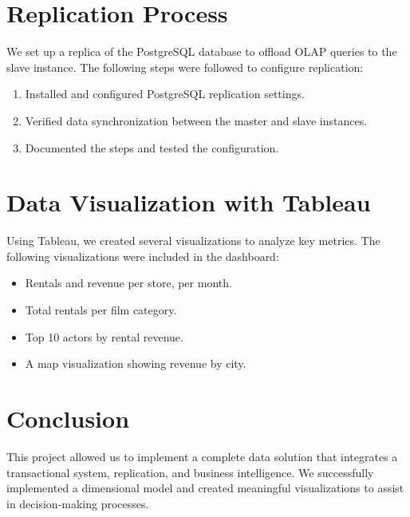 \documentclass[a4paper, 12pt]{article}
\begin{document}
\section{Replication Process}
We set up a replica of the PostgreSQL database to offload OLAP queries to the slave instance. The following steps were followed to configure replication:
\begin{enumerate}
    \item Installed and configured PostgreSQL replication settings.
    \item Verified data synchronization between the master and slave instances.
    \item Documented the steps and tested the configuration.
\end{enumerate}

\section{Data Visualization with Tableau}
Using Tableau, we created several visualizations to analyze key metrics. The following visualizations were included in the dashboard:
\begin{itemize}
    \item Rentals and revenue per store, per month.
    \item Total rentals per film category.
    \item Top 10 actors by rental revenue.
    \item A map visualization showing revenue by city.
\end{itemize}

\section{Conclusion}
This project allowed us to implement a complete data solution that integrates a transactional system, replication, and business intelligence. We successfully implemented a dimensional model and created meaningful visualizations to assist in decision-making processes.

\newpage

\end{document}
